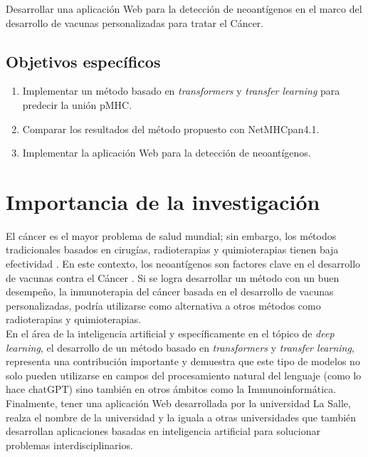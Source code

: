 \documentclass[a4paper]{article}
\begin{document}
	Desarrollar una aplicación Web para la detección de neoantígenos en el marco del desarrollo de vacunas personalizadas para tratar el Cáncer.
	
	\subsection{Objetivos específicos}
	\begin{enumerate}
		\item Implementar un método basado en \textit{transformers} y \textit{transfer learning} para predecir la unión pMHC.	
		\item Comparar los resultados del método propuesto con NetMHCpan4.1.
		\item Implementar la aplicación Web para la detección de neoantígenos.
	

		

		
	\end{enumerate}

	
\section{Importancia de la investigación}

El cáncer es el mayor problema de salud mundial; sin embargo, los métodos tradicionales basados en cirugías, radioterapias y quimioterapias tienen baja efectividad \citep{peng2019neoantigen}. En este contexto, los neoantígenos son factores clave en el desarrollo de vacunas contra el Cáncer  \citep{borden2022cancer,chen2021challenges,gopanenko2020main}. Si se logra desarrollar un método con un buen desempeño, la inmunoterapia del cáncer basada en el desarrollo de vacunas personalizadas, podría utilizarse como alternativa a otros métodos como radioterapias y quimioterapias. \\

En el área de la inteligencia artificial y específicamente en el tópico de \textit{deep learning}, el desarrollo de un método basado en \textit{transformers} y \textit{transfer learning}, representa una contribución importante  y demuestra que este tipo de modelos no solo pueden utilizarse en campos del procesamiento natural del lenguaje (como lo hace chatGPT) sino también en otros ámbitos como la Immunoinformática.\\

Finalmente, tener una aplicación Web desarrollada por la universidad La Salle, realza el nombre de la universidad y la iguala a otras universidades que también desarrollan aplicaciones basadas en inteligencia artificial para solucionar  problemas interdisciplinarios.
\end{document}
